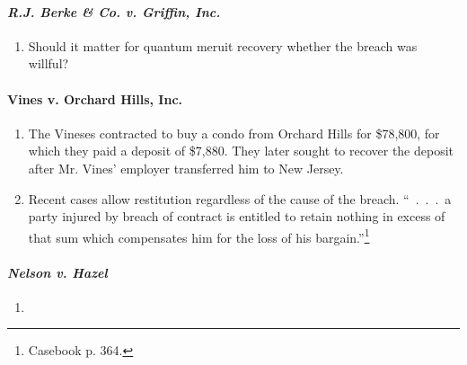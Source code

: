 \paragraph{\emph{R.J. Berke \& Co. v. Griffin, Inc.}}

\begin{enumerate}
    \item Should it matter for quantum meruit recovery whether the breach was 
    willful?
\end{enumerate}

\paragraph{Vines v. Orchard Hills, Inc.}

\begin{enumerate}
    \item The Vineses contracted to buy a condo from Orchard Hills for \$78,800, 
    for which they paid a deposit of \$7,880. They later sought to recover the 
    deposit after Mr. Vines' employer transferred him to New Jersey.
    \item Recent cases allow restitution regardless of the cause of the 
    breach. ``~.~.~.~a party injured by breach of contract is entitled to 
    retain nothing in excess of that sum which compensates him for the loss of 
    his bargain.''\footnote{Casebook p. 364.}
\end{enumerate}

\paragraph{\emph{Nelson v. Hazel}}

\begin{enumerate}
    \item %
\end{enumerate}

